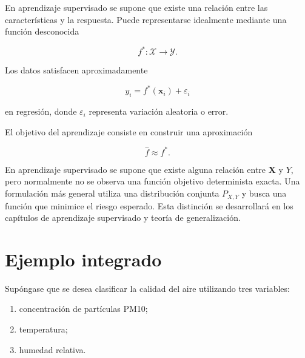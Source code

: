 \documentclass[
  spanish,
  10.5pt,
  letterpaper,
  DIV=11,
  numbers=noendperiod,
  oneside,
  open=any]{scrreprt}
\providecommand{\tightlist}{%
  \setlength{\itemsep}{0pt}\setlength{\parskip}{0pt}}
\theoremstyle{definition}
\theoremstyle{definition}
\theoremstyle{plain}
\theoremstyle{remark}
\begin{document}
En aprendizaje supervisado se supone que existe una relación entre las
características y la respuesta. Puede representarse idealmente mediante
una función desconocida

\[
f^{*}:\mathcal{X}\to\mathcal{Y}.
\]

Los datos satisfacen aproximadamente

\[
y_i=f^{*}(\mathbf{x}_i)+\varepsilon_i
\]

en regresión, donde \(\varepsilon_i\) representa variación aleatoria o
error.

El objetivo del aprendizaje consiste en construir una aproximación

\[
\widehat{f}\approx f^{*}.
\]

\begin{tcolorbox}[enhanced jigsaw, arc=.35mm, bottomrule=.15mm, bottomtitle=1mm, breakable, colback=white, colbacktitle=quarto-callout-important-color!10!white, colframe=quarto-callout-important-color-frame, coltitle=black, left=2mm, leftrule=.75mm, opacityback=0, opacitybacktitle=0.6, rightrule=.15mm, title=\textcolor{quarto-callout-important-color}{\faExclamation}\hspace{0.5em}{Función objetivo y datos observados}, titlerule=0mm, toprule=.15mm, toptitle=1mm]

En aprendizaje supervisado se supone que existe alguna relación entre
\(\mathbf{X}\) y \(Y\), pero normalmente no se observa una función
objetivo determinista exacta. Una formulación más general utiliza una
distribución conjunta \(P_{X,Y}\) y busca una función que minimice el
riesgo esperado. Esta distinción se desarrollará en los capítulos de
aprendizaje supervisado y teoría de generalización.

\end{tcolorbox}

\section*{Ejemplo integrado}\label{ejemplo-integrado}


Supóngase que se desea clasificar la calidad del aire utilizando tres
variables:

\begin{enumerate}
\def\labelenumi{\arabic{enumi}.}
\tightlist
\item
  concentración de partículas PM10;
\item
  temperatura;
\item
  humedad relativa.
\end{enumerate}
\end{document}
